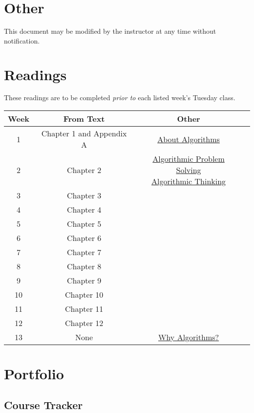 \documentclass[12pt]{amsart}
\begin{document}
\section{Other}
This document may be modified by the instructor at any time without notification.
\section{Readings}
These readings are to be completed \textit{prior to} each listed week's Tuesday class.

\begin{table}[ht]
\begin{center}
\begin{tabular}{|c|c|c|c|}
	\hline
   \rowcolor[gray]{.9}
	Week & From Text & Other \\
	\hline
	 1 & Chapter 1 and Appendix A & \href{run:./support_files/alg_intro.pdf}{About Algorithms}\\
	\hline
	 2 & Chapter 2 & \makecell{
	\href{run:./support_files/aps.pdf}{Algorithmic Problem Solving}\\
	\href{run:./support_files/alg_think.pdf}{Algorithmic Thinking}} 
	\\
	\hline
	3 & Chapter 3 &\\
	\hline
	4 & Chapter 4 &\\
	\hline
	5 & Chapter 5 &\\
	\hline
	6 & Chapter 6 &\\
	\hline
	7 & Chapter 7 &\\
	\hline
	8 & Chapter 8 &\\
	\hline
	9 & Chapter 9 &\\
	\hline
	10 & Chapter 10 &\\
	\hline
	11 & Chapter 11 &\\
	\hline
	12 & Chapter 12 &\\
	\hline
	13 & None &\href{https://developer.apple.com/videos/play/wwdc2018/223/}{Why Algorithms?}\\
	\hline
\end{tabular}
\end{center}
\end{table}
\newpage
\section{Portfolio}
\subsection{Course Tracker}
\end{document}
